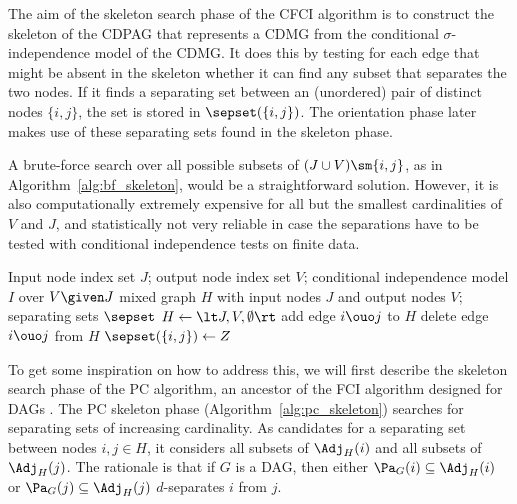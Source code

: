 The aim of the skeleton search phase of the CFCI algorithm is to construct the skeleton of the CDPAG that represents a CDMG from the conditional $\sigma$-independence model of the CDMG.
It does this by testing for each edge that might be absent in the skeleton whether it can find any subset that separates the two nodes.
If it finds a separating set between an (unordered) pair of distinct nodes $\{i, j\}$, the set is stored in $\sepset(\{i,j\})$.
The orientation phase later makes use of these separating sets found in the skeleton phase.

A brute-force search over all possible subsets of $(J \cup V)\sm \{i,j\}$, as in Algorithm~\ref{alg:bf_skeleton}, would be a straightforward solution.
However, it is also computationally extremely expensive for all but the smallest cardinalities of $V$ and $J$, and statistically not very reliable in case the separations have to be tested with conditional independence tests on finite data.
\begin{algorithm}
  \begin{algorithmic}[1]
    \Input Input node index set $J$; output node index set $V$; conditional independence model $I$ over $V \given J$
    \Output mixed graph $H$ with input nodes $J$ and output nodes $V$; separating sets $\sepset$
    \State $H \leftarrow \lt J, V, \emptyset \rt$
      \State add edge $i \ouo j$ to $H$
        \State delete edge $i \ouo j$ from $H$
        \State $\sepset(\{i,j\}) \leftarrow Z$
        \Break
      \EndIf
      \EndFor
    \EndFor
  \end{algorithmic}
  \caption{Brute-force skeleton algorithm $\mathtt{BFskeleton}(J,V,I)$.\label{alg:bf_skeleton}}
\end{algorithm}

To get some inspiration on how to address this, we will first describe the skeleton search phase of the PC algorithm, an ancestor of the FCI algorithm designed for DAGs \cite{SGS2000}.
The PC skeleton phase (Algorithm~\ref{alg:pc_skeleton}) searches for separating sets of increasing cardinality. 
As candidates for a separating set between nodes $i,j \in H$, it considers all subsets of $\Adj_H(i)$ and all subsets of $\Adj_H(j)$.
The rationale is that if $G$ is a DAG, then either $\Pa_G(i) \subseteq \Adj_H(i)$ or $\Pa_G(j) \subseteq \Adj_H(j)$ $d$-separates $i$ from $j$.

